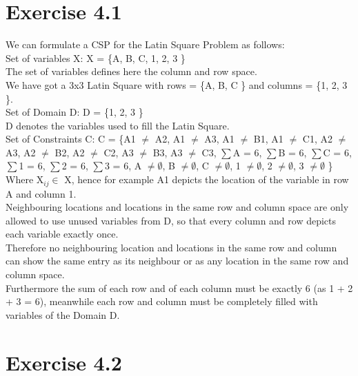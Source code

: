 \documentclass[12pt]{article}
\begin{document}
\section*{Exercise 4.1}
We can formulate a CSP for the Latin Square Problem as follows:\\
Set of variables X: X = \{A, B, C, 1, 2, 3 \}\\
The set of variables defines here the column and row space. \\
We have got a 3x3 Latin Square with rows = \{A, B, C \} and columns = \{1, 2, 3 \}.\\
Set of Domain D: D = \{1, 2, 3 \}\\
D denotes the variables used to fill the Latin Square.\\
Set of Constraints C: C = \{A1 $\neq$ A2, A1 $\neq$ A3, A1 $\neq$ B1, A1 $\neq$ C1, A2 $\neq$ A3, A2 $\neq$ B2, A2 $\neq$ C2, A3 $\neq$ B3, A3 $\neq$ C3, $\sum$A = 6, $\sum$B = 6, $\sum$C = 6, $\sum$1 = 6, $\sum$2 = 6, $\sum$3 = 6, A $\neq \emptyset$, B $\neq \emptyset$, C $\neq \emptyset$, 1 $\neq \emptyset$, 2 $\neq \emptyset$, 3 $\neq \emptyset$ \}\\
Where X$_{ij} \in $ X, hence for example A1 depicts the location of the variable in row A and column 1.\\
Neighbouring locations and locations in the same row and column space are only allowed to use unused variables from D, so that every column and row depicts each variable exactly once.\\
Therefore no neighbouring location and locations in the same row and column can show the same entry as its neighbour or as any location in the same row and column space.\\
Furthermore the sum of each row and of each column must be exactly 6 (as 1 + 2 + 3 = 6), meanwhile each row and column must be completely filled with variables of the Domain D.\\



\section*{Exercise 4.2}
\end{document}

